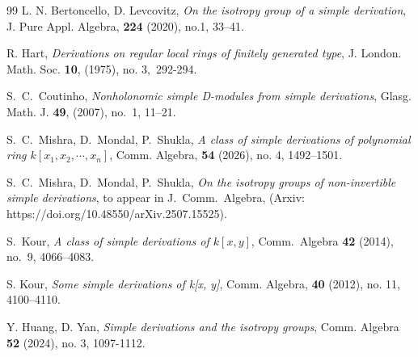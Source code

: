 \documentclass[11pt]{amsart}
\theoremstyle{definition}
\theoremstyle{remark}
\numberwithin{equation}{theorem}
\begin{document}
\begin{thebibliography}{99}
 L. N. Bertoncello, D. Levcovitz, \emph{On the isotropy group of a simple derivation}, J.
Pure Appl. Algebra, \textbf{224} (2020), no.1, 33--41.

 R. Hart, \emph{Derivations on regular local rings of finitely generated type}, J. London. Math. Soc. \textbf{10}, (1975), no. 3,~292-294. 

 S.~C.~Coutinho, \emph{Nonholonomic simple D-modules from simple derivations}, Glasg. Math. J. \textbf{49}, (2007), no.~1, 11--21. 

 S.~C.~Mishra, D.~Mondal, P.~Shukla, \emph{A class of simple derivations of polynomial ring $k[x_1,x_2,\cdots,x_n]$}, Comm. Algebra, \textbf{54} (2026), no. 4, 1492–1501.

 S.~C.~Mishra, D.~Mondal, P.~Shukla, \emph{On the isotropy groups of non-invertible
simple derivations}, to appear in J.~Comm.~Algebra, (Arxiv: https://doi.org/10.48550/arXiv.2507.15525).

 S.~Kour, \emph{A class of simple derivations of $k[x,y]$}, Comm.~Algebra \textbf{42}
(2014), no.~9, 4066--4083.

 S. Kour, \emph{Some simple derivations of k[x, y]}, Comm. Algebra, \textbf{40} (2012), no. 11, 4100--4110.

 Y. Huang, D. Yan, \emph{Simple derivations and the isotropy groups}, Comm. Algebra
\textbf{52} (2024), no. 3, 1097-1112.


\end{thebibliography}
\end{document}
